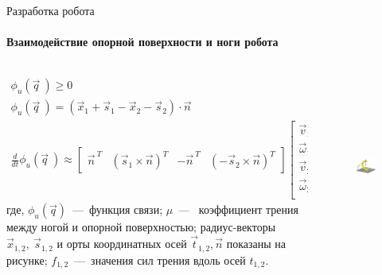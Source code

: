 \documentclass[aspectratio=169,xcolor=table,10pt]{beamer}
\begin{document}
\begin{frame}[t]{Разработка робота}
    \framesubtitle{Взаимодействие опорной поверхности и ноги робота}
    \vspace{-0.6cm}
    \begin{columns}[T,onlytextwidth]
        \begin{column}{0.69\textwidth}
            \begin{align*}
                \phi_u(\vec{q}\ ) \geqslant 0                                                     \\
                \phi_u(\vec{q}\ ) = (\vec{x}_1 + \vec{s}_1 - \vec{x}_2 - \vec{s}_2) \cdot \vec{n} \\
                \frac{d }{d t}\phi_u(\vec{q}\ ) \approx \begin{bmatrix}
                                                            \vec{n}^{\ T} & (\vec{s}_1 \times \vec{n})^T & -\vec{n}^{\ T} & (-\vec{s}_2 \times \vec{n})^T
                                                        \end{bmatrix} \begin{bmatrix}
                                                                          \vec{v}_1      \\
                                                                          \vec{\omega}_1 \\
                                                                          \vec{v}_2      \\
                                                                          \vec{\omega}_2 \\
                                                                      \end{bmatrix}
            \end{align*}
            где, $\phi_u(\vec{q})$~---~функция связи; $ \mu $~---~ коэффициент трения между ногой и опорной поверхностью;  радиус-векторы $\vec{x}_{1,2},\ \vec{s}_{1,2}$ и орты координатных осей $\vec{t}_{1,2}, \vec{n}$ показаны на рисунке; $ f_{1,2} $~---~значения сил трения вдоль осей $t_{1,2}$.
        \end{column}
        \begin{column}{0.29\textwidth}
            \vspace{-0.4cm}
            \begin{figure}[H]
                \centering\includegraphics[height=6cm,width=1\textwidth,keepaspectratio]{contact_interaction.png}

\end{figure}
\end{column}
\end{columns}
\end{frame}
\end{document}
